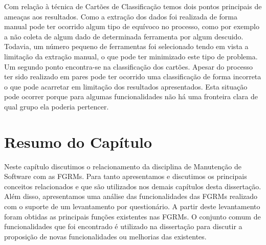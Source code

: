 Com relação à técnica de Cartões de Classificação temos dois pontos principais
de ameaças aos resultados. Como a extração dos dados foi realizada de forma
manual pode ter ocorrido algum tipo de equívoco no processo, como por exemplo a
não coleta de algum dado de determinada ferramenta por algum descuido. Todavia,
um número pequeno de ferramentas foi selecionado tendo em vista a limitação da
extração manual, o que pode ter minimizado este tipo de problema. Um segundo
ponto encontra-se na classificação dos cartões. Apesar do processo ter sido
realizado em pares pode ter ocorrido uma classificação de forma incorreta o que
pode acarretar em limitação dos resultados apresentados. Esta situação pode
ocorrer porque para algumas funcionalidades não há uma fronteira clara de qual
grupo ela poderia pertencer.

\section{Resumo do Capítulo}\label{sec:resumo_do_capitulo}

Neste capítulo discutimos o relacionamento da disciplina de Manutenção de
Software com as FGRMs. Para tanto apresentamos e discutimos os principais
conceitos relacionados e que são utilizados nos demais capítulos desta
dissertação. Além disso, apresentamos uma análise das funcionalidades das FGRMs
realizado com o suporte de um levantamento por questionário. A partir deste
levantamento foram obtidas as principais funções existentes nas FGRMs. O
conjunto comum de funcionalidades que foi encontrado é utilizado na dissertação
para discutir a proposição de novas funcionalidades ou melhorias das
existentes.
